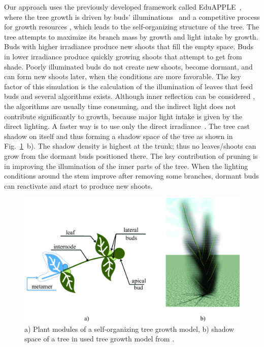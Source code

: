 Our approach uses the previously developed framework called EduAPPLE~\cite{kohek_eduapple:_2015}, 
where the tree growth is driven by buds' illuminations~\cite{benes_efficient_1996,benes_visual_1997,mech_visual_1996} and a competitive process for growth resources \cite{alsweis_modeling_2005,arvo_modeling_1988,palubicki_self-organizing_2009,runions_modeling_2007}, which leads to the self-organizing structure of the tree. The
tree attempts to maximize its branch mass by growth and light intake by
growth. Buds with higher irradiance produce new shoots that fill the
empty space. Buds in lower irradiance produce quickly growing shoots
that attempt to get from shade. Poorly illuminated buds do not create
new shoots, become dormant, and can form new shoots later, when the
conditions are more favorable. The key factor of this simulation is the
calculation of the illumination of leaves that feed buds and several
algorithms exists. Although inner reflection can be considered \cite{soler_efficient_2003},
the algorithms are usually time consuming, and the indirect light does
not contribute significantly to growth, because major light intake is
given by the direct lighting. A faster way is to use only the direct
irradiance~\cite{benes_visual_1997,benes_efficient_1996,mech_visual_1996,pirk_plastic_2012}. 
The tree cast shadow on itself and thus
forming a shadow space of the tree as shown in Fig.~\ref{fig:my_figure1}~b). The shadow
density is highest at the trunk; thus no leaves/shoots can grow from the
dormant buds positioned there. The key contribution of pruning is in
improving the illumination of the inner parts of the tree. When the
lighting conditions around the stem improve after removing some
branches, dormant buds can reactivate and start to produce new shoots.
\begin{figure}[hbt]
    \centering
    \includegraphics[width=4.5in]{figs/image1.jpg}
    \caption{a) Plant modules of a self-organizing tree growth
model, b) shadow space of a tree in used tree growth model from \cite{kohek_eduapple:_2015}.}
    \label{fig:my_figure1}
\end{figure}


